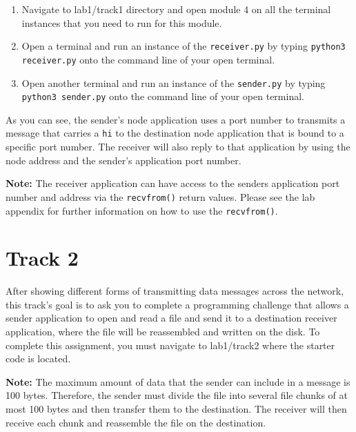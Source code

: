 \documentclass[11pt]{article}
\begin{document}

\begin{enumerate}
    \item Navigate to lab1/track1 directory and open module 4 on all the terminal instances that you need to run for this module.
    \item Open a terminal and run an instance of the \texttt{receiver.py} by typing \texttt{python3 receiver.py} onto the command line of your open terminal.
    \item Open another terminal and run an instance of the \texttt{sender.py} by typing \texttt{python3 sender.py} onto the command line of your open terminal.
\end{enumerate}

As you can see, the sender's node application uses a port number to transmits a message that carries a \texttt{hi} to the destination node application that is bound to a specific port number. The receiver will also reply to that application by using the node address and the sender's application port number.

\textbf{Note:}
The receiver application can have access to the senders application port number and address via the \texttt{recvfrom()} return values. Please see the lab appendix for further information on how to use the \texttt{recvfrom()}.

\section{Track 2}
\label{sec:track2}
After showing different forms of transmitting data messages across the network, this track's goal is to ask you to complete a programming challenge that allows a sender application to open and read a file and send it to a destination receiver application, where the file will be reassembled and written on the disk.
To complete this assignment, you must navigate to lab1/track2 where the starter code is located.

\textbf{Note:}
The maximum amount of data that the sender can include in a message is 100 bytes. Therefore, the sender must divide the file into several file chunks of at most 100 bytes and then transfer them to the destination. The receiver will then receive each chunk and reassemble the file on the destination.
\end{document}
